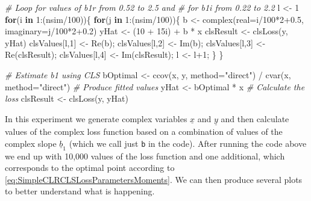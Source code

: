 \documentclass[
]{book}
\newenvironment{Shaded}{\begin{snugshade}}{\end{snugshade}}
\newcommand{\AttributeTok}[1]{\textcolor[rgb]{0.77,0.63,0.00}{#1}}
\newcommand{\CommentTok}[1]{\textcolor[rgb]{0.56,0.35,0.01}{\textit{#1}}}
\newcommand{\ControlFlowTok}[1]{\textcolor[rgb]{0.13,0.29,0.53}{\textbf{#1}}}
\newcommand{\DecValTok}[1]{\textcolor[rgb]{0.00,0.00,0.81}{#1}}
\newcommand{\FloatTok}[1]{\textcolor[rgb]{0.00,0.00,0.81}{#1}}
\newcommand{\FunctionTok}[1]{\textcolor[rgb]{0.00,0.00,0.00}{#1}}
\newcommand{\NormalTok}[1]{#1}
\newcommand{\OtherTok}[1]{\textcolor[rgb]{0.56,0.35,0.01}{#1}}
\newcommand{\SpecialCharTok}[1]{\textcolor[rgb]{0.00,0.00,0.00}{#1}}
\newcommand{\StringTok}[1]{\textcolor[rgb]{0.31,0.60,0.02}{#1}}
\begin{document}
\begin{Shaded}
\begin{Highlighting}[]
\CommentTok{\# Loop for values of b1r from 0.52 to 2.5 and}
\CommentTok{\# for b1i from 0.22 to 2.2}
\NormalTok{l }\OtherTok{\textless{}{-}} \DecValTok{1}
\ControlFlowTok{for}\NormalTok{(i }\ControlFlowTok{in} \DecValTok{1}\SpecialCharTok{:}\NormalTok{(nsim}\SpecialCharTok{/}\DecValTok{100}\NormalTok{))\{}
    \ControlFlowTok{for}\NormalTok{(j }\ControlFlowTok{in} \DecValTok{1}\SpecialCharTok{:}\NormalTok{(nsim}\SpecialCharTok{/}\DecValTok{100}\NormalTok{))\{}
\NormalTok{        b }\OtherTok{\textless{}{-}} \FunctionTok{complex}\NormalTok{(}\AttributeTok{real=}\NormalTok{i}\SpecialCharTok{/}\DecValTok{100}\SpecialCharTok{*}\DecValTok{2}\FloatTok{+0.5}\NormalTok{, }\AttributeTok{imaginary=}\NormalTok{j}\SpecialCharTok{/}\DecValTok{100}\SpecialCharTok{*}\DecValTok{2}\FloatTok{+0.2}\NormalTok{)}
\NormalTok{        yHat }\OtherTok{\textless{}{-}}\NormalTok{ (}\DecValTok{10} \SpecialCharTok{+}\NormalTok{ 15i) }\SpecialCharTok{+}\NormalTok{ b }\SpecialCharTok{*}\NormalTok{ x}
\NormalTok{        clsResult }\OtherTok{\textless{}{-}} \FunctionTok{clsLoss}\NormalTok{(y, yHat)}
\NormalTok{        clsValues[l,}\DecValTok{1}\NormalTok{] }\OtherTok{\textless{}{-}} \FunctionTok{Re}\NormalTok{(b);}
\NormalTok{        clsValues[l,}\DecValTok{2}\NormalTok{] }\OtherTok{\textless{}{-}} \FunctionTok{Im}\NormalTok{(b);}
\NormalTok{        clsValues[l,}\DecValTok{3}\NormalTok{] }\OtherTok{\textless{}{-}} \FunctionTok{Re}\NormalTok{(clsResult);}
\NormalTok{        clsValues[l,}\DecValTok{4}\NormalTok{] }\OtherTok{\textless{}{-}} \FunctionTok{Im}\NormalTok{(clsResult);}
\NormalTok{        l }\OtherTok{\textless{}{-}}\NormalTok{ l}\SpecialCharTok{+}\DecValTok{1}\NormalTok{;}
\NormalTok{    \}}
\NormalTok{\}}

\CommentTok{\# Estimate b1 using CLS}
\NormalTok{bOptimal }\OtherTok{\textless{}{-}} \FunctionTok{ccov}\NormalTok{(x, y, }\AttributeTok{method=}\StringTok{"direct"}\NormalTok{) }\SpecialCharTok{/}
            \FunctionTok{cvar}\NormalTok{(x, }\AttributeTok{method=}\StringTok{"direct"}\NormalTok{)}
\CommentTok{\# Produce fitted values}
\NormalTok{yHat }\OtherTok{\textless{}{-}}\NormalTok{ bOptimal }\SpecialCharTok{*}\NormalTok{ x}
\CommentTok{\# Calculate the loss}
\NormalTok{clsResult }\OtherTok{\textless{}{-}} \FunctionTok{clsLoss}\NormalTok{(y, yHat)}
\end{Highlighting}
\end{Shaded}

In this experiment we generate complex variables \(\underline{x}\) and \(\underline{y}\) and then calculate values of the complex loss function based on a combination of values of the complex slope \(\underline{b}_1\) (which we call just \texttt{b} in the code). After running the code above we end up with 10,000 values of the loss function and one additional, which corresponds to the optimal point according to \eqref{eq:SimpleCLRCLSLossParametersMoments}. We can then produce several plots to better understand what is happening.
\end{document}
